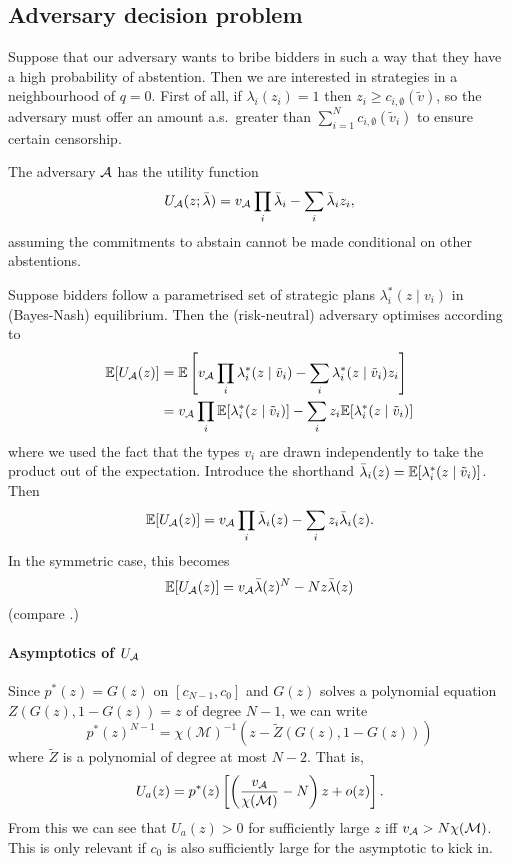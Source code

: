 \newpage
\subsection{Adversary decision problem}

Suppose that our adversary wants to bribe bidders in such a way that they have a high probability of abstention.
%
Then we are interested in strategies in a neighbourhood of $q=0$.
%
First of all, if $\lambda_i(z_i)=1$ then $z_i\geq c_{i,\emptyset}(\tilde{v})$, so the adversary must offer an amount a.s.~greater than $\sum_{i=1}^N c_{i,\emptyset}(\tilde v_i)$ to ensure certain censorship.


The adversary $\mathcal{A}$ has the utility function
\[
  U_{\mathcal{A}}(z;\bar{\lambda}) = v_{\mathcal{A}}\prod_i\bar\lambda_i - \sum_i\bar\lambda_iz_i,
\]
assuming the commitments to abstain cannot be made conditional on other abstentions.

Suppose bidders follow a parametrised set of strategic plans $\lambda_i^*(z\mid v_i)$ in (Bayes-Nash) equilibrium.
%
Then the (risk-neutral) adversary optimises according to
\begin{align*}
  \mathbb{E}[U_{\mathcal{A}}(z)] &= \mathbb{E} \left[ v_{\mathcal{A}}\prod_i\lambda_i^*(z\mid\tilde v_i) - \sum_i\lambda_i^*(z\mid \tilde v_i)z_i \right] \\
  &= v_{\mathcal{A}}\prod_i\mathbb{E}[\lambda_i^*(z\mid\tilde v_i)] - \sum_iz_i\mathbb{E}[\lambda_i^*(z\mid\tilde v_i)]
\end{align*}
where we used the fact that the types $v_i$ are drawn independently to take the product out of the expectation.
%
Introduce the shorthand $\bar{\lambda}_i(z) = \mathbb{E}[\lambda_i^*(z\mid\tilde v_i)]$.
%
Then
\[ 
  \mathbb{E}[U_{\mathcal{A}}(z)] = v_{\mathcal{A}}\prod_i\bar{\lambda}_i(z) - \sum_iz_i\bar{\lambda}_i(z).
\]
In the symmetric case, this becomes 
\[ 
  \mathbb{E}[U_{\mathcal{A}}(z)] = v_{\mathcal{A}}\bar{\lambda}(z)^N - Nz\bar{\lambda}(z)
\]
(compare \cite[\S A.6]{FPR}.)

\paragraph{Asymptotics of $U_{\mathcal{A}}$}
Since $p^*(z)=G(z)$ on $[c_{N-1},c_0]$ and $G(z)$ solves a polynomial equation $Z(G(z),1-G(z))=z$ of degree $N-1$, we can write
\[
  p^*(z)^{N-1} = \chi(\mathcal{M})^{-1}\left( z - \tilde Z(G(z),1-G(z)) \right)
\]
where $\tilde Z$ is a polynomial of degree at most $N-2$.
%
That is, 
\[
  U_a(z) = p^*(z)\left[ \left(\frac{v_{\mathcal{A}}}{\chi(\mathcal{M})} - N\right) z + o(z) \right].
\] 
From this we can see that $U_a(z)>0$ for sufficiently large $z$ iff $v_{\mathcal{A}} > N\chi(\mathcal{M})$.
%
This is only relevant if $c_0$ is also sufficiently large for the asymptotic to kick in.
  
